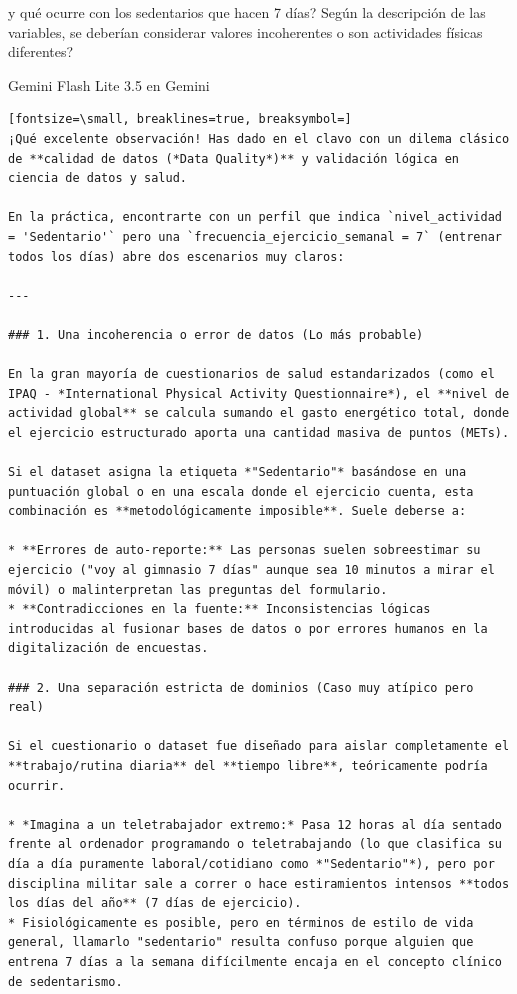 \documentclass[12pt,a4paper,oneside]{book}
\begin{document}
\begin{iaprompt}
y qué ocurre con los sedentarios que hacen 7 días? Según la descripción de las variables, se deberían considerar valores incoherentes o son actividades físicas diferentes?
\end{iaprompt}
\begin{iaresp}{Gemini Flash Lite 3.5 en Gemini}
\begin{Verbatim}[fontsize=\small, breaklines=true, breaksymbol=]
¡Qué excelente observación! Has dado en el clavo con un dilema clásico de **calidad de datos (*Data Quality*)** y validación lógica en ciencia de datos y salud.

En la práctica, encontrarte con un perfil que indica `nivel_actividad = 'Sedentario'` pero una `frecuencia_ejercicio_semanal = 7` (entrenar todos los días) abre dos escenarios muy claros:

---

### 1. Una incoherencia o error de datos (Lo más probable)

En la gran mayoría de cuestionarios de salud estandarizados (como el IPAQ - *International Physical Activity Questionnaire*), el **nivel de actividad global** se calcula sumando el gasto energético total, donde el ejercicio estructurado aporta una cantidad masiva de puntos (METs).

Si el dataset asigna la etiqueta *"Sedentario"* basándose en una puntuación global o en una escala donde el ejercicio cuenta, esta combinación es **metodológicamente imposible**. Suele deberse a:

* **Errores de auto-reporte:** Las personas suelen sobreestimar su ejercicio ("voy al gimnasio 7 días" aunque sea 10 minutos a mirar el móvil) o malinterpretan las preguntas del formulario.
* **Contradicciones en la fuente:** Inconsistencias lógicas introducidas al fusionar bases de datos o por errores humanos en la digitalización de encuestas.

### 2. Una separación estricta de dominios (Caso muy atípico pero real)

Si el cuestionario o dataset fue diseñado para aislar completamente el **trabajo/rutina diaria** del **tiempo libre**, teóricamente podría ocurrir.

* *Imagina a un teletrabajador extremo:* Pasa 12 horas al día sentado frente al ordenador programando o teletrabajando (lo que clasifica su día a día puramente laboral/cotidiano como *"Sedentario"*), pero por disciplina militar sale a correr o hace estiramientos intensos **todos los días del año** (7 días de ejercicio).
* Fisiológicamente es posible, pero en términos de estilo de vida general, llamarlo "sedentario" resulta confuso porque alguien que entrena 7 días a la semana difícilmente encaja en el concepto clínico de sedentarismo.


\end{Verbatim}
\end{iaresp}
\end{document}
